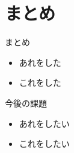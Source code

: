\documentclass[compress,dvipdfmx,11pt]{beamer}
\begin{document}
\section{まとめ}
\label{sec:orgc84405a}

\begin{frame}[label={sec:org0755e16}]{まとめ}
\begin{itemize}
\item あれをした
\item これをした
\end{itemize}
\end{frame}

\begin{frame}[label={sec:org0012268}]{今後の課題}
\begin{itemize}
\item あれをしたい
\item これをしたい
\end{itemize}
\end{frame}
\end{document}
